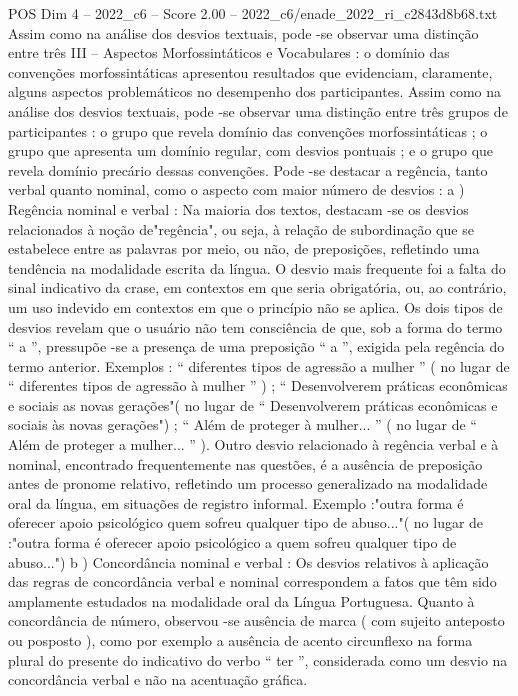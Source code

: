 \begin{textsample}{POS Dim 4 – 2022\_c6 – Score 2.00 – 2022\_c6/enade\_2022\_ri\_c2843d8b68.txt}
Assim como na análise dos desvios textuais, pode -se observar uma distinção entre três III – Aspectos Morfossintáticos e Vocabulares : o domínio das convenções morfossintáticas apresentou resultados que evidenciam, claramente, alguns aspectos problemáticos no desempenho dos participantes.
Assim como na análise dos desvios textuais, pode -se observar uma distinção entre três grupos de participantes : o grupo que revela domínio das convenções morfossintáticas ; o grupo que apresenta um domínio regular, com desvios pontuais ; e o grupo que revela domínio precário dessas convenções.
Pode -se destacar a regência, tanto verbal quanto nominal, como o aspecto com maior número de desvios : a ) Regência nominal e verbal : Na maioria dos textos, destacam -se os desvios relacionados à noção de"regência", ou seja, à relação de subordinação que se estabelece entre as palavras por meio, ou não, de preposições, refletindo uma tendência na modalidade escrita da língua.
O desvio mais frequente foi a falta do sinal indicativo da crase, em contextos em que seria obrigatória, ou, ao contrário, um uso indevido em contextos em que o princípio não se aplica.
Os dois tipos de desvios revelam que o usuário não tem consciência de que, sob a forma do termo “ a ”, pressupõe -se a presença de uma preposição “ a ”, exigida pela regência do termo anterior.
Exemplos : “ diferentes tipos de agressão a mulher ” ( no lugar de “ diferentes tipos de agressão à mulher ” ) ; “ Desenvolverem práticas econômicas e sociais as novas gerações"( no lugar de “ Desenvolverem práticas econômicas e sociais às novas gerações") ; “ Além de proteger à mulher... ” ( no lugar de “ Além de proteger a mulher... ” ).
Outro desvio relacionado à regência verbal e à nominal, encontrado frequentemente nas questões, é a ausência de preposição antes de pronome relativo, refletindo um processo generalizado na modalidade oral da língua, em situações de registro informal.
Exemplo :"outra forma é oferecer apoio psicológico quem sofreu qualquer tipo de abuso..."( no lugar de :"outra forma é oferecer apoio psicológico a quem sofreu qualquer tipo de abuso...") b ) Concordância nominal e verbal : Os desvios relativos à aplicação das regras de concordância verbal e nominal correspondem a fatos que têm sido amplamente estudados na modalidade oral da Língua Portuguesa.
Quanto à concordância de número, observou -se ausência de marca ( com sujeito anteposto ou posposto ), como por exemplo a ausência de acento circunflexo na forma plural do presente do indicativo do verbo “ ter ”, considerada como um desvio na concordância verbal e não na acentuação gráfica.

\end{textsample}
